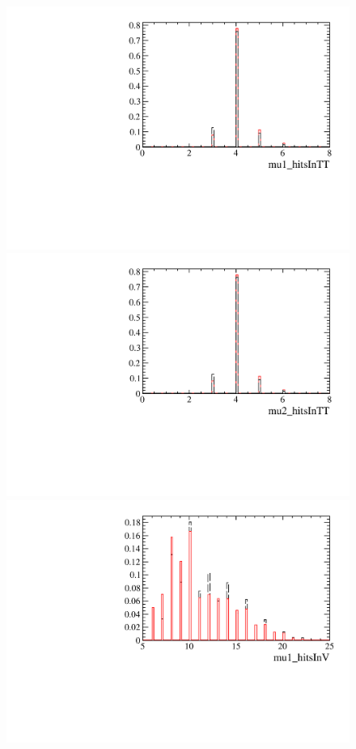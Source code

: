 \begin{figure} [htb!]
\begin{center}
\includegraphics[scale=0.20]{figs/mu1_hitsInTTPARTIALptcut.pdf}
\includegraphics[scale=0.20]{figs/mu2_hitsInTTPARTIALptcut.pdf}
\includegraphics[scale=0.20]{figs/mu1_hitsInVPARTIALptcut.pdf}

\end{center}
\end{figure}
